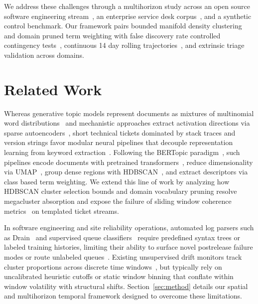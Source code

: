 \documentclass[sigconf,anonymous,pbalance]{acmart}
\begin{document}
We address these challenges through a multihorizon study across an open source software engineering stream~\cite{lhoest2021datasets}, an enterprise service desk corpus~\cite{vogel2024itsm}, and a synthetic control benchmark. Our framework pairs bounded manifold density clustering and domain pruned term weighting with false discovery rate controlled contingency tests~\cite{fisher1922interpretation, benjamini1995controlling}, continuous 14 day rolling trajectories~\cite{mann1945nonparametric, kendall1948rank}, and extrinsic triage validation across domains.

\section{Related Work}
Whereas generative topic models represent documents as mixtures of multinomial word distributions~\cite{blei2003latent, dieng2020dynamic} and mechanistic approaches extract activation directions via sparse autoencoders~\cite{zheng2026model}, short technical tickets dominated by stack traces and version strings favor modular neural pipelines that decouple representation learning from keyword extraction~\cite{sia2020tired, bianchi2021pre, grootendorst2022bertopic}. Following the BERTopic paradigm~\cite{grootendorst2022bertopic}, such pipelines encode documents with pretrained transformers~\cite{reimers2019sentence, wang2020minilm}, reduce dimensionality via UMAP~\cite{mcinnes2018umap}, group dense regions with HDBSCAN~\cite{campello2013density, mcinnes2017hdbscan}, and extract descriptors via class based term weighting. We extend this line of work by analyzing how HDBSCAN cluster selection bounds and domain vocabulary pruning resolve megacluster absorption and expose the failure of sliding window coherence metrics~\cite{newman2010automatic, roder2015exploring, hoyle2021automated} on templated ticket streams.

In software engineering and site reliability operations, automated log parsers such as Drain~\cite{he2017drain} and supervised queue classifiers~\cite{agarwal2012identifying, chen2020incidental} require predefined syntax trees or labeled training histories, limiting their ability to surface novel postrelease failure modes or route unlabeled queues~\cite{chen2020incidental}. Existing unsupervised drift monitors track cluster proportions across discrete time windows~\cite{dieng2020dynamic, grootendorst2022bertopic}, but typically rely on uncalibrated heuristic cutoffs or static window binning that conflate within window volatility with structural shifts. Section~\ref{sec:method} details our spatial and multihorizon temporal framework designed to overcome these limitations.
\end{document}
